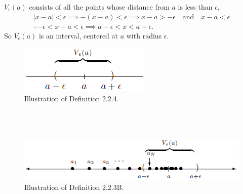 \documentclass{article}
\begin{document}
            $V_\epsilon(a)$ consists of all the points whose distance from $a$ is less than $\epsilon$,
            \begin{gather*}
                |x-a|<\epsilon \implies -(x-a)<\epsilon \implies x-a>-\epsilon \quad \text{and} \quad x-a < \epsilon\\
                \therefore -\epsilon < x-a < \epsilon \implies a-\epsilon < x < a+\epsilon.
            \end{gather*}
            So $V_\epsilon(a)$ is an interval, centered at $a$ with radius $\epsilon$.
            \begin{figure}[ht!]
                \centering
                \includegraphics[width=0.35\linewidth]{figs/definition2.2.4.png}
                \caption{Illustration of Definition 2.2.4.}
            \end{figure}
            \\ \\
            
            \begin{figure}[ht!]
                \centering
                \includegraphics[width=0.8\linewidth]{figs/definition2.2.3b.png}
                \caption{Illustration of Definition 2.2.3B.}
            \end{figure}
            
\end{document}
